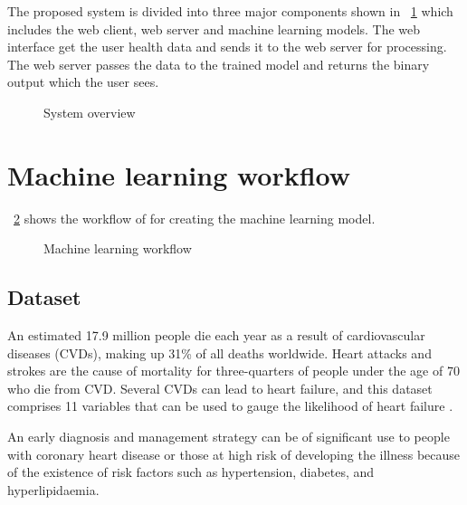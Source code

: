 \noindent
The proposed system is divided into three major components shown in \figurename~\ref{fig:sytem-overview} which includes the web client, web server and machine learning models. The web interface get the user health data and sends it to the web server for processing. The web server passes the data to the trained model and returns the binary output which the user sees.

\begin{figure}[htb]
	\centering
	\caption{System overview}
	\label{fig:sytem-overview}
\end{figure}


\section{Machine learning workflow}
\figurename~\ref{fig:ml-workflow} shows the workflow of for creating the machine learning model.

\begin{figure}[htb]
	\centering
	\caption{Machine learning workflow}
	\label{fig:ml-workflow}
\end{figure}

\subsection{Dataset}
An estimated 17.9 million people die each year as a result of cardiovascular diseases (CVDs), making up 31\% of all deaths worldwide. Heart attacks and strokes are the cause of mortality for three-quarters of people under the age of 70 who die from CVD. Several CVDs can lead to heart failure, and this dataset comprises 11 variables that can be used to gauge the likelihood of heart failure \citep{world-health-organization-2019}.

An early diagnosis and management strategy can be of significant use to people with coronary heart disease or those at high risk of developing the illness because of the existence of risk factors such as hypertension, diabetes, and hyperlipidaemia.

